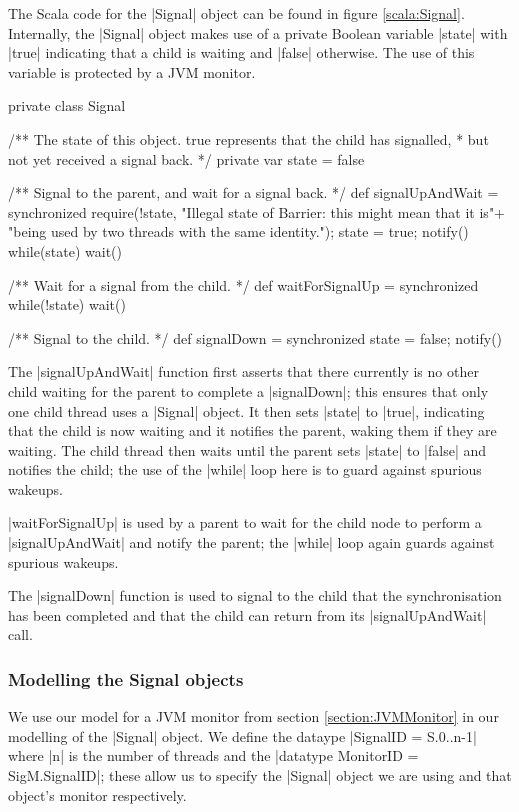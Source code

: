 The Scala code for the |Signal| object can be found in figure \ref{scala:Signal}. Internally, the |Signal| object makes use of a private Boolean variable |state| with |true| indicating that a child is waiting and |false| otherwise. The use of this variable is protected by a JVM monitor.
\newpage 
\begin{scala}[label=scala:Signal, caption={The {\scalastyle Signal} object from \cite{LoweBarrier}}]
private class Signal{
  /** The state of this object.  true represents that the child has signalled,
    * but not yet received a signal back. */
  private var state = false

  /** Signal to the parent, and wait for a signal back. */
  def signalUpAndWait = synchronized{
    require(!state, 
      "Illegal state of Barrier: this might mean that it is\n"+
      "being used by two threads with the same identity.");
    state = true; notify()
    while(state) wait()
  }

  /** Wait for a signal from the child. */
  def waitForSignalUp = synchronized{ while(!state) wait() }

  /** Signal to the child. */
  def signalDown = synchronized{ state = false; notify() }
}
\end{scala}

The |signalUpAndWait| function first asserts that there currently is no other child waiting for the parent to complete a |signalDown|; this ensures that only one child thread uses a |Signal| object. It then sets |state| to |true|, indicating that the child is now waiting and it notifies the parent, waking them if they are waiting. The child thread then waits until the parent sets |state| to |false| and notifies the child; the use of the |while| loop here is to guard against spurious wakeups.

|waitForSignalUp| is used by a parent to wait for the child node to perform a |signalUpAndWait| and notify the parent; the |while| loop again guards against spurious wakeups.

The |signalDown| function is used to signal to the child that the synchronisation has been completed and that the child can return from its |signalUpAndWait| call.

\subsubsection{Modelling the Signal objects}

We use our model for a JVM monitor from section \ref{section:JVMMonitor} in our modelling of the |Signal| object. We define the dataype |SignalID = S.{0..n-1}| where |n| is the number of threads and the |datatype MonitorID = SigM.SignalID|; these allow us to specify the |Signal| object we are using and that object's monitor respectively.

